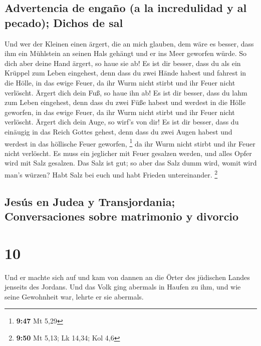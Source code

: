 \hypertarget{advertencia-de-engauxf1o-a-la-incredulidad-y-al-pecado-dichos-de-sal}{%
\subsection{Advertencia de engaño (a la incredulidad y al pecado);
Dichos de
sal}\label{advertencia-de-engauxf1o-a-la-incredulidad-y-al-pecado-dichos-de-sal}}

 Und wer der Kleinen einen ärgert, die an mich glauben,
dem wäre es besser, dass ihm ein Mühlstein an seinen Hals gehängt und er
ins Meer geworfen würde.  So dich aber deine Hand ärgert,
so haue sie ab! Es ist dir besser, dass du als ein Krüppel zum Leben
eingehest, denn dass du zwei Hände habest und fahrest in die Hölle, in
das ewige Feuer,  da ihr Wurm nicht stirbt und ihr Feuer
nicht verlöscht.  Ärgert dich dein Fuß, so haue ihn ab!
Es ist dir besser, dass du lahm zum Leben eingehest, denn dass du zwei
Füße habest und werdest in die Hölle geworfen, in das ewige Feuer,
 da ihr Wurm nicht stirbt und ihr Feuer nicht verlöscht.
 Ärgert dich dein Auge, so wirf's von dir! Es ist dir
besser, dass du einäugig in das Reich Gottes gehest, denn dass du zwei
Augen habest und werdest in das höllische Feuer geworfen, \footnote{\textbf{9:47}
  Mt 5,29}  da ihr Wurm nicht stirbt und ihr Feuer nicht
verlöscht.  Es muss ein jeglicher mit Feuer gesalzen
werden, und alles Opfer wird mit Salz gesalzen.  Das Salz
ist gut; so aber das Salz dumm wird, womit wird man's würzen? Habt Salz
bei euch und habt Frieden untereinander. \footnote{\textbf{9:50} Mt
  5,13; Lk 14,34; Kol 4,6}

\hypertarget{jesuxfas-en-judea-y-transjordania-conversaciones-sobre-matrimonio-y-divorcio}{%
\subsection{Jesús en Judea y Transjordania; Conversaciones sobre
matrimonio y
divorcio}\label{jesuxfas-en-judea-y-transjordania-conversaciones-sobre-matrimonio-y-divorcio}}

\hypertarget{section-9}{%
\section{10}\label{section-9}}

 Und er machte sich auf und kam von dannen an die Örter
des jüdischen Landes jenseits des Jordans. Und das Volk ging abermals in
Haufen zu ihm, und wie seine Gewohnheit war, lehrte er sie abermals.

